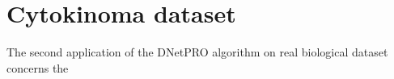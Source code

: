 \documentclass{standalone}
\begin{document}
\section[Cytokinoma Dataset]{Cytokinoma dataset}\label{cytokine}

The second application of the DNetPRO algorithm on real biological dataset concerns the

\end{document}
